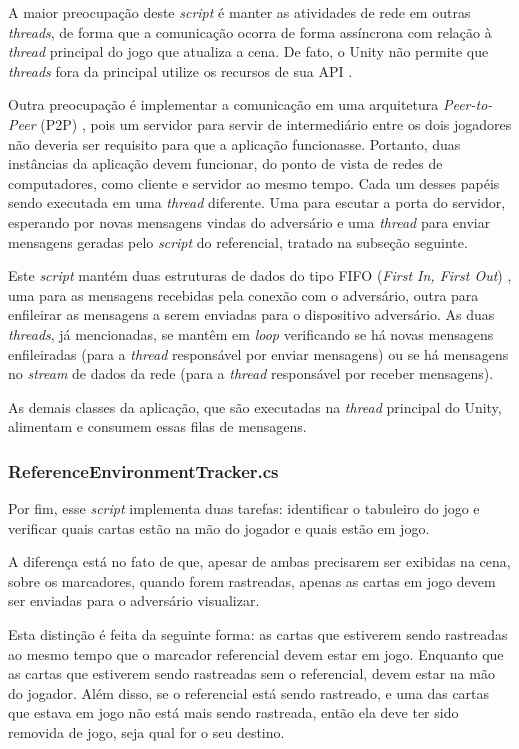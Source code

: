 \documentclass[conference]{IEEEtran}
\begin{document}
A maior preocupação deste \textit{script} é manter as atividades de rede em 
outras \textit{threads}, de forma que a comunicação ocorra de forma assíncrona 
com relação à \textit{thread} principal do jogo que atualiza a cena. De fato, o 
Unity não permite que \textit{threads} fora da principal utilize os recursos de 
sua API \cite{multithreading}.

Outra preocupação é implementar a comunicação em uma arquitetura \textit{
Peer-to-Peer} (P2P) \cite{p2p}, pois um servidor para servir de intermediário 
entre os dois jogadores não deveria ser requisito para que a aplicação 
funcionasse. Portanto, duas instâncias da aplicação devem funcionar, do ponto de 
vista de redes de computadores, como cliente e servidor ao mesmo tempo. Cada um 
desses papéis sendo executada em uma \textit{thread} diferente. Uma para escutar 
a porta do servidor, esperando por novas mensagens vindas do adversário e uma 
\textit{thread} para enviar mensagens geradas pelo \textit{script} do 
referencial, tratado na subseção seguinte.

Este \textit{script} mantém duas estruturas de dados do tipo FIFO (\textit{First 
In, First Out}) \cite{fifo}, uma para as mensagens recebidas pela conexão com o 
adversário, outra para enfileirar as mensagens a serem enviadas para o 
dispositivo adversário. As duas \textit{threads}, já mencionadas, se mantêm em 
\textit{loop} verificando se há novas mensagens enfileiradas (para a 
\textit{thread} responsável por enviar mensagens) ou se há mensagens no 
\textit{stream} de dados da rede (para a \textit{thread} responsável por receber 
mensagens).

As demais classes da aplicação, que são executadas na \textit{thread} principal 
do Unity, alimentam e consumem essas filas de mensagens.

\subsubsection{ReferenceEnvironmentTracker.cs}
\label{referencetrack}
Por fim, esse \textit{script} implementa duas tarefas: identificar o tabuleiro 
do jogo e verificar quais cartas estão na mão do jogador e quais estão em jogo.

A diferença está no fato de que, apesar de ambas precisarem ser exibidas na 
cena, sobre os marcadores, quando forem rastreadas, apenas as cartas em jogo 
devem ser enviadas para o adversário visualizar.

Esta distinção é feita da seguinte forma: as cartas que estiverem sendo 
rastreadas ao mesmo tempo que o marcador referencial devem estar em jogo. 
Enquanto que as cartas que estiverem sendo rastreadas sem o referencial, devem 
estar na mão do jogador. Além disso, se o referencial está sendo rastreado, e 
uma das cartas que estava em jogo não está mais sendo rastreada, então ela 
deve ter sido removida de jogo, seja qual for o seu destino.
\end{document}
